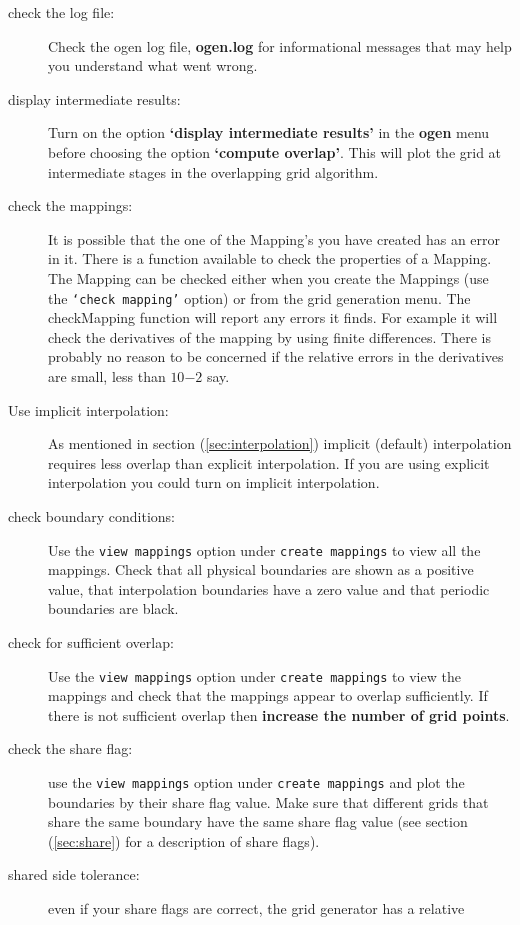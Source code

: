 \documentclass[xcolor=rgb,svgnames,dvipsnames]{article}
\begin{document}
\begin{description}
  \item[check the log file:] Check the ogen log file, {\bf ogen.log} for informational messages that
     may help you understand what went wrong.
  \item[display intermediate results:] Turn on the option {\bf `display intermediate results'} in the
     {\bf ogen} menu before choosing the option {\bf `compute overlap'}. This will plot the grid at
     intermediate stages in the overlapping grid algorithm.
  \item[check the mappings:] It is possible that the one of the Mapping's you have created has an error in it.
     There is a function available to check the properties of a Mapping. The Mapping can be checked
     either when you create the Mappings (use the {\tt `check mapping'} option) or from the grid generation
     menu. The checkMapping function will report any errors it finds. For example it will check the 
     derivatives of the mapping by using finite differences. There is probably no reason to be concerned 
     if the relative errors in the derivatives are small, less than  $10{-2}$ say.
  \item[Use implicit interpolation:] As mentioned in section (\ref{sec:interpolation}) implicit (default)
     interpolation requires less overlap than explicit interpolation. If you are using 
     explicit interpolation you could turn on implicit interpolation.
  \item[check boundary conditions:] Use the {\tt view mappings} option under {\tt create mappings}
     to view all the mappings. Check that all physical boundaries are shown as a positive value, that
     interpolation boundaries have a zero value and that periodic boundaries are black. 
  \item[check for sufficient overlap:] Use the {\tt view mappings} option under {\tt create mappings} to view
      the mappings and check that the mappings appear to overlap sufficiently. If there is not sufficient overlap
      then {\bf increase the number of grid points}.
  \item[check the share flag:] use the {\tt view mappings} option under {\tt create mappings} and plot the
     boundaries by their share flag value. Make sure that different grids that share the same boundary
     have the same share flag value (see section (\ref{sec:share}) for a description of share flags).
  \item[shared side tolerance:] even if your share flags are correct, the grid generator has a relative

\end{description}
\end{document}
